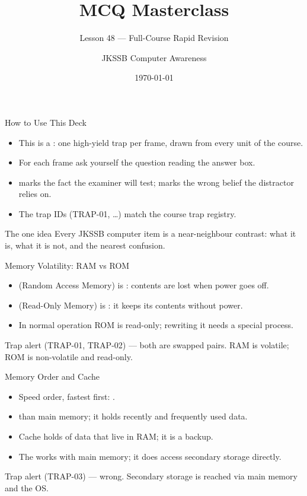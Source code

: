 \documentclass[aspectratio=169]{beamer}
\title{MCQ Masterclass}
\subtitle{Lesson 48 --- Full-Course Rapid Revision}
\author{JKSSB Computer Awareness}
\date{\today}
\begin{document}
\frame{\titlepage}

\begin{frame}{How to Use This Deck}
  \begin{itemize}
    \item This is a : one high-yield trap per frame, drawn
      from every unit of the course.
    \item For each frame ask yourself the question  reading the
      answer box.
    \item {} marks the fact the examiner will test; 
      marks the wrong belief the distractor relies on.
    \item The trap IDs (TRAP-01, \dots) match the course trap registry.
  \end{itemize}
  \begin{block}{The one idea}
    Every JKSSB computer item is a near-neighbour contrast: what it is, what
    it is not, and the nearest confusion.
  \end{block}
\end{frame}

\begin{frame}{Memory Volatility: RAM vs ROM}
  \begin{itemize}
    \item {} (Random Access Memory) is : contents are lost
      when power goes off.
    \item {} (Read-Only Memory) is : it keeps its
      contents without power.
    \item In normal operation ROM is read-only; rewriting it needs a special
      process.
  \end{itemize}
  \begin{alertblock}{Trap alert (TRAP-01, TRAP-02)}
     --- both
    are swapped pairs. RAM is volatile; ROM is non-volatile and read-only.
  \end{alertblock}
\end{frame}

\begin{frame}{Memory Order and Cache}
  \begin{itemize}
    \item Speed order, fastest first: .
    \item {} than main memory; it holds recently and
      frequently used data.
    \item Cache holds  of data that live in RAM; it is
       a backup.
    \item The  works with main memory; it does  access
      secondary storage directly.
  \end{itemize}
  \begin{alertblock}{Trap alert (TRAP-03)}
     --- wrong. Secondary storage is
    reached via main memory and the OS.
  \end{alertblock}
\end{frame}
\end{document}
